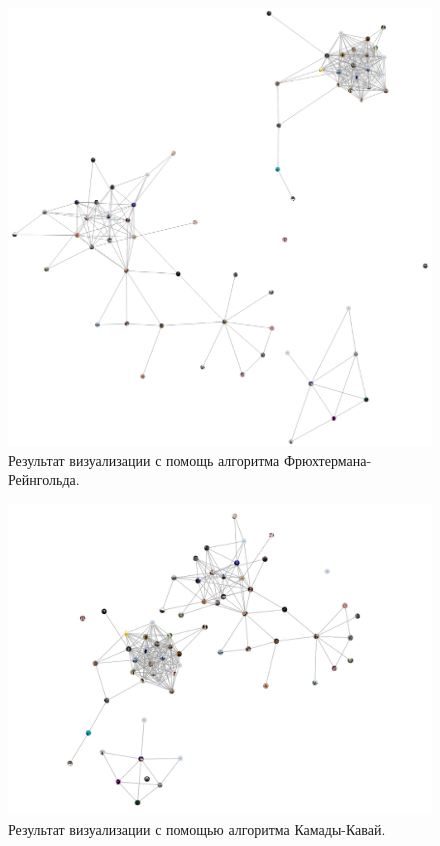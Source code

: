 \documentclass[14pt, russian]{scrartcl}
\begin{document}
\begin{figure}[H]
\centering
  \begin{minipage}[t]{.7\textwidth}
  \centering
\includegraphics[width=.7\textwidth]{./imgs/fr.png}
  \end{minipage}
\caption{Результат визуализации с помощь алгоритма Фрюхтермана-Рейнгольда.}
\label{fig:fr_result}
\end{figure}


\begin{figure}[H]
\centering
  \begin{minipage}[t]{.9\textwidth}
  \centering
\includegraphics[width=.9\textwidth]{./imgs/kk.png}
  \end{minipage}
\caption{Результат визуализации с помощью алгоритма Камады-Кавай.}
\label{fig:kk_result}
\end{figure}
\end{document}
